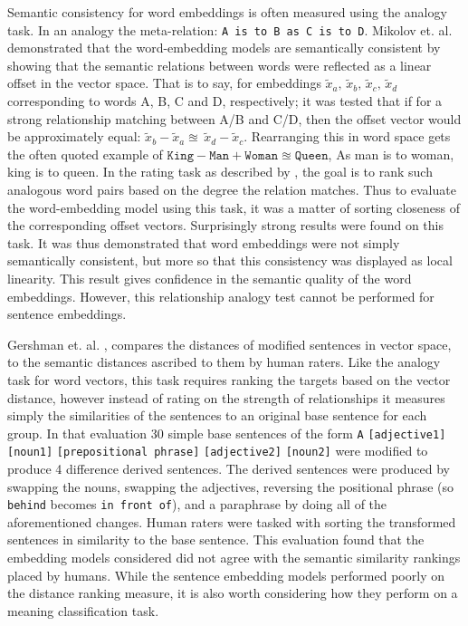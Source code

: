 \documentclass[]{book}
\begin{document}
Semantic consistency for word embeddings is often measured using the
analogy task. In an analogy the meta-relation: \texttt{A is to B as
C is to D}. Mikolov et. al.\cite{mikolov2013linguisticsubstructures}
demonstrated that the word-embedding models are semantically consistent
by showing that the semantic relations between words were reflected
as a linear offset in the vector space. That is to say, for embeddings
$\tilde{x}_{a},\,\tilde{x}_{b},\,\tilde{x}_{c},\,\tilde{x}_{d}$ corresponding
to words A, B, C and D, respectively; it was tested that if for a
strong relationship matching between A/B and C/D, then the offset
vector would be approximately equal: $\tilde{x}_{b}-\tilde{x}_{a}\approxeq\,\tilde{x}_{d}-\tilde{x}_{c}$.
Rearranging this in word space gets the often quoted example of $\mathtt{King}-\mathtt{Man}+\mathtt{Woman}\approxeq\mathtt{Queen}$,
As man is to woman, king is to queen. In the rating task as described
by \cite{jurgens2012semeval}, the goal is to rank such analogous
word pairs based on the degree the relation matches. Thus to evaluate
the word-embedding model using this task, it was a matter of sorting
closeness of the corresponding offset vectors. Surprisingly strong
results were found on this task\cite{mikolov2013linguisticsubstructures}.
It was thus demonstrated that word embeddings were not simply semantically
consistent, but more so that this consistency was displayed as local
linearity. This result gives confidence in the semantic quality of
the word embeddings. However, this relationship analogy test cannot
be performed for sentence embeddings.

Gershman et. al. \cite{gershmanphrase}, compares the distances of
modified sentences in vector space, to the semantic distances ascribed
to them by human raters. Like the analogy task for word vectors, this
task requires ranking the targets based on the vector distance, however
instead of rating on the strength of relationships it measures simply
the similarities of the sentences to an original base sentence for
each group. In that evaluation 30 simple base sentences of the form
\texttt{A} \texttt{{[}adjective1{]}} \texttt{{[}noun1{]}} \texttt{{[}prepositional
phrase{]}} \texttt{{[}adjective2{]}} \texttt{{[}noun2{]}} were modified
to produce 4 difference derived sentences. The derived sentences were
produced by swapping the nouns, swapping the adjectives, reversing
the positional phrase (so\emph{ }\texttt{behind} becomes \texttt{in
front of}), and a paraphrase by doing all of the aforementioned changes.
Human raters were tasked with sorting the transformed sentences in
similarity to the base sentence. This evaluation found that the embedding
models considered did not agree with the semantic similarity rankings
placed by humans. While the sentence embedding models performed poorly
on the distance ranking measure, it is also worth considering how
they perform on a meaning classification task.
\end{document}
